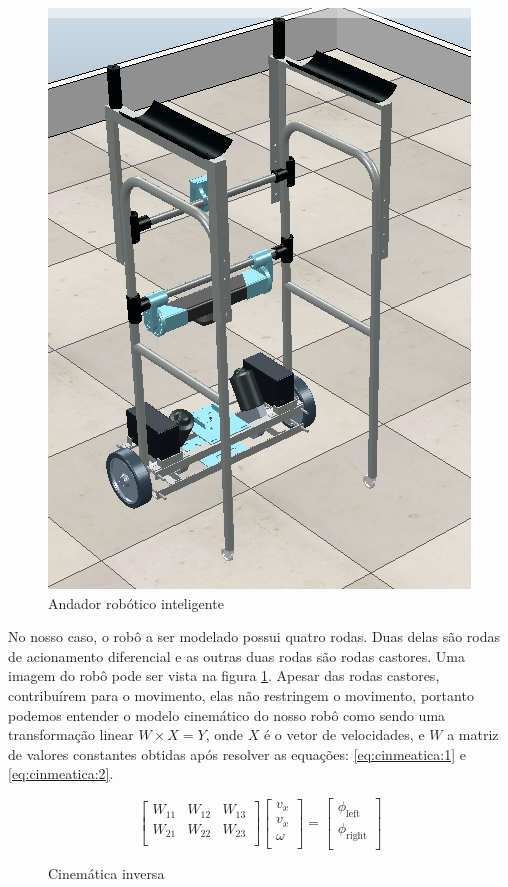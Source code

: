 \begin{figure}[H]
    \centering
    \includegraphics[scale=0.4]{figuras/smart_walker.png}
    \caption{Andador robótico inteligente}
    \label{fig:andador:robotico:inteligente}
\end{figure}


No nosso caso, o robô a ser modelado possui quatro rodas. Duas delas são
rodas de acionamento diferencial e as outras duas rodas são rodas castores.
Uma imagem do robô pode ser vista na figura \ref{fig:andador:robotico:inteligente}.
Apesar das rodas castores, contribuírem para o movimento, elas não restringem
o movimento, portanto podemos entender o modelo cinemático do nosso robô
como sendo uma transformação linear $W \times X = Y$, onde $X$ é o vetor
de velocidades, e $W$ a matriz de valores constantes obtidas após resolver
as equações: \ref{eq:cinmeatica:1} e \ref{eq:cinmeatica:2}.

\begin{figure}[H]
    \[
    \begin{bmatrix}
        W_{11} &  W_{12} & W_{13} \\
        W_{21} &  W_{22} & W_{23} \\
    \end{bmatrix}
    \begin{bmatrix}
        v_x \\
        v_x \\
        \omega \\
    \end{bmatrix}
    =
    \begin{bmatrix}
        \phi_{\text{left}} \\
        \phi_{\text{right}} \\
    \end{bmatrix}
\]
    \caption{Cinemática inversa}
\end{figure}

